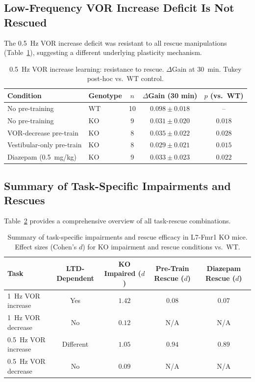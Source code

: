 \documentclass[11pt]{article}
\begin{document}
\subsection{Low-Frequency VOR Increase Deficit Is Not Rescued}

The 0.5~Hz VOR increase deficit was resistant to all rescue manipulations (Table~\ref{tab:low_freq}), suggesting a different underlying plasticity mechanism.

\begin{table}[H]
\centering
\caption{0.5~Hz VOR increase learning: resistance to rescue. $\Delta$Gain at 30~min. Tukey post-hoc vs.\ WT control.}
\label{tab:low_freq}
\begin{tabular}{llccc}
\toprule
Condition & Genotype & $n$ & $\Delta$Gain (30 min) & $p$ (vs.\ WT) \\
\midrule
No pre-training & WT & 10 & $0.098 \pm 0.018$ & -- \\
No pre-training & KO & 9 & $0.031 \pm 0.020$ & $0.018$ \\
VOR-decrease pre-train & KO & 8 & $0.035 \pm 0.022$ & $0.028$ \\
Vestibular-only pre-train & KO & 8 & $0.029 \pm 0.021$ & $0.015$ \\
Diazepam (0.5~mg/kg) & KO & 9 & $0.033 \pm 0.023$ & $0.022$ \\
\bottomrule
\end{tabular}
\end{table}

\subsection{Summary of Task-Specific Impairments and Rescues}

Table~\ref{tab:summary} provides a comprehensive overview of all task-rescue combinations.

\begin{table}[H]
\centering
\caption{Summary of task-specific impairments and rescue efficacy in L7-Fmr1 KO mice. Effect sizes (Cohen's $d$) for KO impairment and rescue conditions vs.\ WT.}
\label{tab:summary}
\begin{tabular}{lcccc}
\toprule
Task & LTD-Dependent & KO Impaired ($d$) & Pre-Train Rescue ($d$) & Diazepam Rescue ($d$) \\
\midrule
1~Hz VOR increase & Yes & $1.42$ & $0.08$ & $0.07$ \\
1~Hz VOR decrease & No & $0.12$ & N/A & N/A \\
0.5~Hz VOR increase & Different & $1.05$ & $0.94$ & $0.89$ \\
0.5~Hz VOR decrease & No & $0.09$ & N/A & N/A \\
\bottomrule
\end{tabular}
\end{table}
\end{document}
